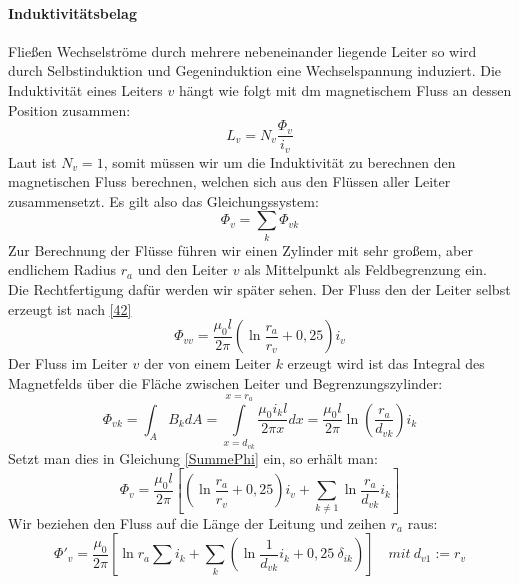 \paragraph{Induktivitätsbelag}
Fließen Wechselströme durch mehrere nebeneinander liegende Leiter so wird durch Selbstinduktion und Gegeninduktion eine Wechselspannung induziert.
Die Induktivität eines Leiters $v$ hängt wie folgt mit dm magnetischem Fluss an dessen Position zusammen:
\begin{equation}
L_v = N_v \frac{\Phi_v}{i_v}
\end{equation}
Laut \cite{Flosdorff} %
ist $N_v = 1$, somit müssen wir um die Induktivität zu berechnen den magnetischen Fluss berechnen, welchen sich aus den Flüssen aller Leiter zusammensetzt. Es gilt also das Gleichungssystem:
\begin{equation}\label{SummePhi}
\Phi_v = \sum_k \Phi_{vk}
\end{equation}
Zur Berechnung der Flüsse führen wir einen Zylinder mit sehr großem, aber endlichem Radius $r_a$ und den Leiter $v$ als Mittelpunkt als Feldbegrenzung ein. Die Rechtfertigung dafür werden wir später sehen.
Der Fluss den der Leiter selbst erzeugt ist nach \ref{42}
\begin{equation}
\Phi_{vv} = \frac{\mu_0l}{2\pi} \left( \ln\frac{r_a}{r_v} + 0,25 \right) i_v
\end{equation}
Der Fluss im Leiter $v$ der von einem Leiter $k$ erzeugt wird ist das Integral des Magnetfelds über die Fläche zwischen Leiter und Begrenzungszylinder:
\begin{equation}
\Phi_{vk} = \int_A B_k dA = \int\limits_{x=d_{vk}}^{x=r_a} \frac{\mu_0i_k l}{2\pi x}dx =
\frac{\mu_0l}{2\pi}\ln\left(\frac{r_a}{d_{vk}}\right) i_k
\end{equation}
Setzt man dies in Gleichung \ref{SummePhi} ein, so erhält man:
\begin{equation}
\Phi_v = \frac{\mu_0l}{2\pi} \left[ \left( \ln\frac{r_a}{r_v} +0,25\right) i_v + \sum_{k\neq1}\ln\frac{r_a}{d_{vk}} i_k \right]
\end{equation}
Wir beziehen den Fluss auf die Länge der Leitung und zeihen $r_a$ raus:
\begin{equation}
\Phi'_v = \frac{\mu_0}{2\pi}
 \left[
   \ln r_a \sum i_k +
   \sum_k \left( \ln\frac{1}{d_{vk}} i_k +
   0,25 \: \delta_{ik} \right)
 \right]
\quad mit \: d_{v1}:=r_v
\end{equation}
